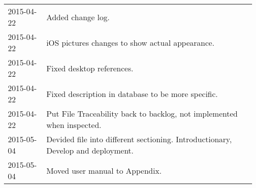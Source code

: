 
\begin{tabularx}{\textwidth}{lX}
	2015-04-22 & Added change log.\\
	2015-04-22 & iOS pictures changes to show actual appearance.\\
    2015-04-22 & Fixed desktop references. \\
	2015-04-22 & Fixed description in database to be more specific. \\
	2015-04-22 & Put File Traceability back to backlog, not implemented when inspected.\\
	2015-05-04 & Devided file into different sectioning. Introductionary, Develop and deployment. \\
	2015-05-04 & Moved user manual to Appendix.\\
\end{tabularx}
